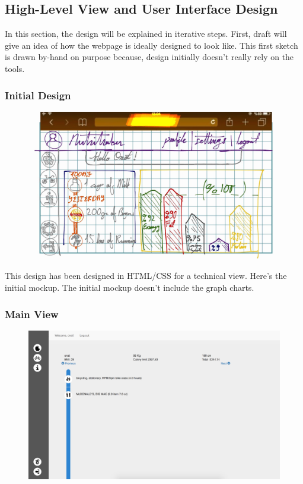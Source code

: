 \newpage
\subsection{High-Level View and User Interface Design}

In this section, the design will be explained in iterative steps.
First, draft will give an idea of how the webpage is ideally designed to look like. This first sketch is drawn by-hand on purpose because, 
design initially doesn't really rely on the tools.


\subsubsection{Initial Design}
\begin{figure}[H]
\centering
\includegraphics[scale=0.235]{1}
\end{figure}


This design has been designed in HTML/CSS for a technical view. Here's
the initial mockup. The initial mockup doesn't include the graph charts.

\subsubsection{Main View}
\begin{figure}[H]
\centering
\includegraphics[scale=0.38]{2}
\end{figure}

